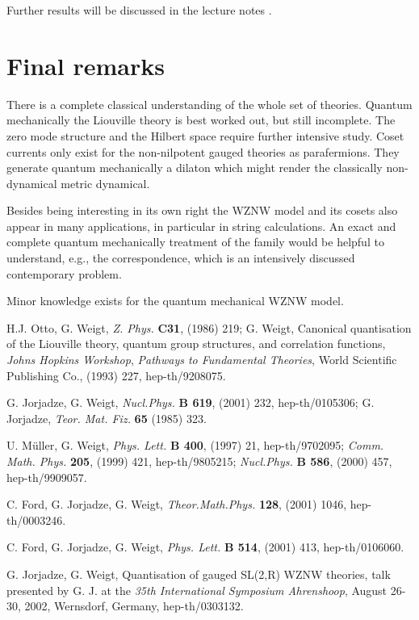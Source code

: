 \documentclass[a4paper,12]{article}
\begin{document}
Further results will be discussed in the lecture notes \cite{JW2}.

\section{Final remarks}

There is a complete classical understanding of the whole set of
\coordHE{} theories. Quantum mechanically the Liouville theory is best
worked out, but still incomplete. The zero mode structure and the
Hilbert space require further intensive study. Coset currents only exist for
the non-nilpotent gauged \coordHE{} theories as parafermions. They generate
quantum mechanically a dilaton which might render the classically
non-dynamical metric dynamical.

Besides being interesting in its own right the \coordHE{} WZNW model
and its cosets also appear in many applications, in particular in
string calculations. An exact and complete quantum mechanically
treatment of the \coordHE{} family would be helpful to understand,
e.g., the \coordHE{} correspondence, which is an intensively
discussed  contemporary problem.

Minor  knowledge exists for the quantum mechanical
\coordHE{} WZNW model.

\begin{thebibliography}{xx}
\frenchspacing

 H.J. Otto, G. Weigt, {\it Z. Phys.} {\bf C31}, (1986)
   219; G. Weigt, Canonical quantisation of the Liouville theory, quantum
   group structures, and correlation functions, {\it Johns Hopkins
   Workshop}, {\it Pathways to Fundamental Theories}, World Scientific
   Publishing Co., (1993) 227, hep-th/9208075.
  
 G. Jorjadze, G. Weigt, {\it Nucl.Phys.} {\bf B 619},
   (2001) 232, hep-th/0105306; G. Jorjadze, 
   {\it Teor. Mat. Fiz.}  {\bf 65} (1985) 323.
  
 U. M\"uller, G. Weigt, {\it Phys. Lett.} {\bf B 400},
   (1997) 21, hep-th/9702095; {\it Comm. Math. Phys.} {\bf 205}, 
   (1999) 421, hep-th/9805215; 
    {\it Nucl.Phys.} {\bf B 586}, (2000) 457, hep-th/9909057.
  
 C. Ford, G. Jorjadze, G. Weigt, 
    {\it Theor.Math.Phys.} {\bf 128}, (2001) 1046, hep-th/0003246.
  
 C. Ford, G. Jorjadze, G. Weigt, 
   {\it Phys. Lett.} { \bf B 514}, (2001) 413, hep-th/0106060.
  
 G. Jorjadze, G. Weigt, Quantisation of gauged SL(2,R) WZNW 
  theories, talk presented by G. J. at the {\it 35th International Symposium
  Ahrenshoop}, August 26-30, 2002, Wernsdorf, Germany, hep-th/0303132.

\end{thebibliography}
\end{document}
